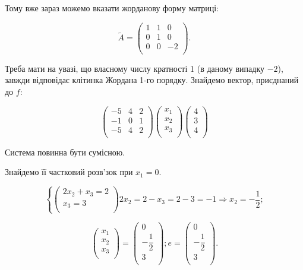 Тому вже зараз можемо вказати жорданову форму матриці: 

$$\tilde{A} = \begin{pmatrix}
	1 & 1 & 0 \\
	0 & 1 & 0 \\
	0 & 0 & -2 \\
\end{pmatrix}.$$

Треба мати на увазі, що власному числу кратності 1 (в даному випадку $-2$),
завжди відповідає клітинка Жордана 1-го порядку.
Знайдемо вектор, приєднаний до $f$:

$$\begin{pmatrix}
	-5 & 4 & 2 \\
	-1 & 0 & 1 \\
	-5 & 4 & 2 \\
\end{pmatrix} \begin{pmatrix}
	x_1 \\
	x_2 \\
	x_3 \\
\end{pmatrix}\begin{pmatrix}
	4 \\
	3 \\
	4 \\
\end{pmatrix} $$

Система повинна бути сумісною.

Знайдемо її частковий розв’зок при $x_1 = 0$.

$$\left\{ \begin{pmatrix}
	2x_2 + x_3 = 2 \\
	x_3 = 3 \\
\end{pmatrix} \right. 2 x_2 = 2 - x_3 = 2 - 3 = -1 \Rightarrow x_2 = -\dfrac{1}{2};$$

$$\begin{pmatrix}
	x_1 \\
	x_2 \\
	x_3 \\
\end{pmatrix} = \begin{pmatrix}
	0 \\
	-\dfrac{1}{2} \\
	3 \\
\end{pmatrix}; e = \begin{pmatrix}
	0 \\
	-\dfrac{1}{2} \\
	3 \\
\end{pmatrix}.$$


